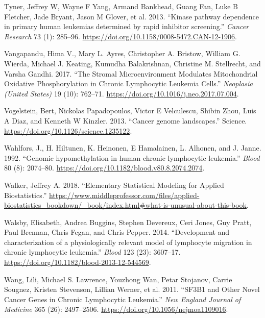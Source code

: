 \documentclass[11pt, a4paper, twosided]{book}
\newenvironment{CSLReferences}%
  {}%
  {\par}
\begin{document}
\begin{CSLReferences}{1}{0}
\leavevmode{}%
Tyner, Jeffrey W, Wayne F Yang, Armand Bankhead, Guang Fan, Luke B Fletcher, Jade Bryant, Jason M Glover, et al. 2013. {``{Kinase pathway dependence in primary human leukemias determined by rapid inhibitor screening}.''} \emph{Cancer Research} 73 (1): 285--96. \url{https://doi.org/10.1158/0008-5472.CAN-12-1906}.

\leavevmode{}%
Vangapandu, Hima V., Mary L. Ayres, Christopher A. Bristow, William G. Wierda, Michael J. Keating, Kumudha Balakrishnan, Christine M. Stellrecht, and Varsha Gandhi. 2017. {``{The Stromal Microenvironment Modulates Mitochondrial Oxidative Phosphorylation in Chronic Lymphocytic Leukemia Cells}.''} \emph{Neoplasia (United States)} 19 (10): 762--71. \url{https://doi.org/10.1016/j.neo.2017.07.004}.

\leavevmode{}%
Vogelstein, Bert, Nickolas Papadopoulos, Victor E Velculescu, Shibin Zhou, Luis A Diaz, and Kenneth W Kinzler. 2013. {``{Cancer genome landscapes}.''} Science. \url{https://doi.org/10.1126/science.1235122}.

\leavevmode{}%
Wahlfors, J., H. Hiltunen, K. Heinonen, E Hamalainen, L. Alhonen, and J. Janne. 1992. {``{Genomic hypomethylation in human chronic lymphocytic leukemia}.''} \emph{Blood} 80 (8): 2074--80. \url{https://doi.org/10.1182/blood.v80.8.2074.2074}.

\leavevmode{}%
Walker, Jeffrey A. 2018. {``{Elementary Statistical Modeling for Applied Biostatistics}.''} \url{https://www.middleprofessor.com/files/applied-biostatistics_bookdown/_book/index.html\#what-is-unusual-about-this-book}.

\leavevmode{}%
Walsby, Elisabeth, Andrea Buggins, Stephen Devereux, Ceri Jones, Guy Pratt, Paul Brennan, Chris Fegan, and Chris Pepper. 2014. {``{Development and characterization of a physiologically relevant model of lymphocyte migration in chronic lymphocytic leukemia}.''} \emph{Blood} 123 (23): 3607--17. \url{https://doi.org/10.1182/blood-2013-12-544569}.

\leavevmode{}%
Wang, Lili, Michael S. Lawrence, Youzhong Wan, Petar Stojanov, Carrie Sougnez, Kristen Stevenson, Lillian Werner, et al. 2011. {``{SF3B1 and Other Novel Cancer Genes in Chronic Lymphocytic Leukemia}.''} \emph{New England Journal of Medicine} 365 (26): 2497--2506. \url{https://doi.org/10.1056/nejmoa1109016}.


\end{CSLReferences}
\end{document}
